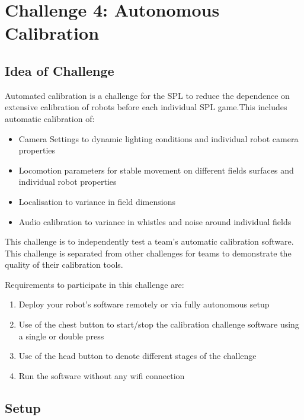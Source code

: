 \section{Challenge 4: Autonomous Calibration}
\label{sec:AutonmousCalivration}

\subsection{Idea of Challenge}

Automated calibration is a challenge for the SPL to reduce the dependence on extensive calibration of robots before each individual SPL game.This includes automatic calibration of:
\begin{itemize}
    \item Camera Settings to dynamic lighting conditions and individual robot camera properties
    \item Locomotion parameters for stable movement on different fields surfaces and individual robot properties
    \item Localisation to variance in field dimensions
    \item Audio calibration to variance in whistles and noise around individual fields
\end{itemize}

This challenge is to independently test a team's automatic calibration software. This challenge is separated from other challenges for teams to demonstrate the quality of their calibration tools.

Requirements to participate in this challenge are:
\begin{enumerate}
    \item Deploy your robot's software remotely or via fully autonomous setup
    \item Use of the chest button to start/stop the calibration challenge software using a single or double press
    \item Use of the head button to denote different stages of the challenge
    \item Run the software without any wifi connection
\end{enumerate}

\subsection{Setup}

